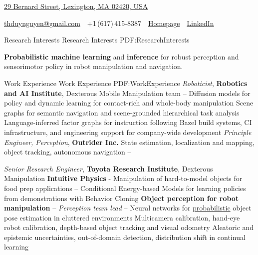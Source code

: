 \documentclass[letterpaper,MMMyyyy,nonstopmode]{simpleresumecv}
\newcommand{\CVAuthor}{Duy Ta}
\newcommand{\CVWebpage}{http://thduynguyen.github.io}
\newcommand{\CVLinkedIn}{https://www.linkedin.com/in/duynguyen-ta/}
\begin{document}

\Title{\CVAuthor}

\begin{SubTitle}
\href{https://www.google.com/maps/place/29+Bernard+St,+Lexington,+MA+02420/}
{29 Bernard Street, Lexington, MA 02420, USA}
\par
\href{mailto:thduynguyen@gmail.com}
{thduynguyen@gmail.com}
\,\SubBulletSymbol\,
+1\,(617)\,415-8387
\,\SubBulletSymbol\,
\href{\CVWebpage}
{\url{Homepage}}
\,\SubBulletSymbol\,
\href{\CVLinkedIn}
{\url{LinkedIn}}
\end{SubTitle}

\begin{Body}


\Section
{Research Interests}
{Research Interests}
{PDF:ResearchInterests}

\BulletItem
\textbf{Probabilistic machine learning} and \textbf{inference} for robust perception and sensorimotor policy in robot manipulation and navigation.


\Section
{Work Experience}
{Work Experience}
{PDF:WorkExperience}
\Entry
{\textit{Roboticist}, \textbf{Robotics and AI Institute}}, Dexterous Mobile Manipulation team
\hfill
{} -- 
\Gap
\BulletItem
Diffusion models for policy and dynamic learning for contact-rich and whole-body manipulation
\BulletItem
Scene graphs for semantic navigation and scene-grounded hierarchical task analysis
\BulletItem
Language-inferred factor graphs for instruction following
\BulletItem
Bazel build systems, CI infrastructure, and engineering support for company-wide development
\BigGap
\Entry
{\textit{Principle Engineer, Perception}, \textbf{Outrider Inc.}}
\Gap
\BulletItem
State estimation, localization and mapping, object tracking, autonomous navigation
\hfill
{} -- 

\BigGap
\Entry
{\textit{Senior Research Engineer}, \textbf{Toyota Research Institute}}, Dexterous Manipulation
\Gap
\BulletItem
\textbf{Intuitive Physics} - Manipulation of hard-to-model objects for food prep applications
\hfill
{} -- 
\SubBulletItem
Conditional Energy-based Models for learning policies from demonstrations with Behavior Cloning 
\BulletItem
\textbf{Object perception for robot manipulation} -- \textit{Perception team lead}
\hfill
{} -- 
\SubBulletItem
Neural networks for \underline{probabilistic} object pose estimation in cluttered environments
\SubBulletItem
Multicamera calibration, hand-eye robot calibration, depth-based object tracking and visual odometry
\SubBulletItem
Aleatoric and epistemic uncertainties, out-of-domain detection, distribution shift in continual learning


\end{Body}
\end{document}
